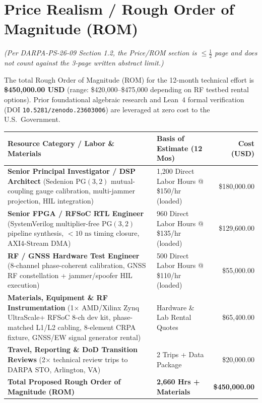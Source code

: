 \documentclass[12pt,letterpaper]{article}
\begin{document}
\newpage
\thispagestyle{empty}
\section*{Price Realism / Rough Order of Magnitude (ROM)}
\textit{(Per DARPA-PS-26-09 Section 1.2, the Price/ROM section is $\le \frac{1}{2}$ page and does not count against the 3-page written abstract limit.)}

The total Rough Order of Magnitude (ROM) for the 12-month technical effort is \textbf{\$450,000.00 USD} (range: \$420,000--\$475,000 depending on RF testbed rental options). Prior foundational algebraic research and Lean~4 formal verification (DOI \texttt{10.5281/zenodo.23603006}) are leveraged at zero cost to the U.S.\ Government.

\vspace{4pt}
\begin{tabular}{@{}p{2.9in}p{1.75in}r@{}}
\toprule
\textbf{Resource Category / Labor \& Materials} & \textbf{Basis of Estimate (12 Mos)} & \textbf{Cost (USD)} \\
\midrule
\textbf{Senior Principal Investigator / DSP Architect} \newline (Sedenion $\mathrm{PG}(3,2)$ mutual-coupling gauge calibration, multi-jammer projection, HIL integration) & 1,200 Direct Labor Hours @ \$150/hr (loaded) & \$180,000.00 \\
\addlinespace[3pt]
\textbf{Senior FPGA / RFSoC RTL Engineer} \newline (SystemVerilog multiplier-free $\mathrm{PG}(3,2)$ pipeline synthesis, $<10\text{ ns}$ timing closure, AXI4-Stream DMA) & 960 Direct Labor Hours @ \$135/hr (loaded) & \$129,600.00 \\
\addlinespace[3pt]
\textbf{RF / GNSS Hardware Test Engineer} \newline (8-channel phase-coherent calibration, GNSS RF constellation + jammer/spoofer HIL execution) & 500 Direct Labor Hours @ \$110/hr (loaded) & \$55,000.00 \\
\addlinespace[3pt]
\textbf{Materials, Equipment \& RF Instrumentation} \newline (1$\times$ AMD/Xilinx Zynq UltraScale+ RFSoC 8-ch dev kit, phase-matched L1/L2 cabling, 8-element CRPA fixture, GNSS/EW signal generator rental) & Hardware \& Lab Rental Quotes & \$65,400.00 \\
\addlinespace[3pt]
\textbf{Travel, Reporting \& DoD Transition Reviews} \newline (2$\times$ technical review trips to DARPA STO, Arlington, VA) & 2 Trips + Data Package & \$20,000.00 \\
\midrule
\textbf{Total Proposed Rough Order of Magnitude (ROM)} & \textbf{2,660 Hrs + Materials} & \textbf{\$450,000.00} \\
\bottomrule
\end{tabular}
\end{document}
